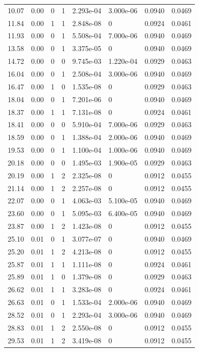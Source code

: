 \documentclass[preview]{standalone}
\begin{document}
{{\begin{tabular}{L{1.2cm}C{1.2cm} C{0.3cm}C{0.5cm} C{1.4cm}C{1.4cm} C{1.4cm}C{1.4cm}}
  10.07  &  0.00  & 0     &  1 &  2.293e-04  & 3.000e-06  & 0.0940 &  0.0469   \\ 
  11.84  &  0.00  & 1     &  1 &  2.848e-08  & 0  & 0.0924 &  0.0461   \\ 
  11.93  &  0.00  & 0     &  1 &  5.508e-04  & 7.000e-06  & 0.0940 &  0.0469   \\ 
  13.58  &  0.00  & 0     &  1 &  3.375e-05  & 0  & 0.0940 &  0.0469   \\ 
  14.72  &  0.00  & 0     &  0 &  9.745e-03  & 1.220e-04  & 0.0929 &  0.0463   \\ 
  16.04  &  0.00  & 0     &  1 &  2.508e-04  & 3.000e-06  & 0.0940 &  0.0469   \\ 
  16.47  &  0.00  & 1     &  0 &  1.535e-08  & 0  & 0.0929 &  0.0463   \\ 
  18.04  &  0.00  & 0     &  1 &  7.201e-06  & 0  & 0.0940 &  0.0469   \\ 
  18.37  &  0.00  & 1     &  1 &  7.131e-08  & 0  & 0.0924 &  0.0461   \\ 
  18.41  &  0.00  & 0     &  0 &  5.910e-04  & 7.000e-06  & 0.0929 &  0.0463   \\ 
  18.59  &  0.00  & 0     &  1 &  1.388e-04  & 2.000e-06  & 0.0940 &  0.0469   \\ 
  19.53  &  0.00  & 0     &  1 &  1.100e-04  & 1.000e-06  & 0.0940 &  0.0469   \\ 
  20.18  &  0.00  & 0     &  0 &  1.495e-03  & 1.900e-05  & 0.0929 &  0.0463   \\ 
  20.19  &  0.00  & 1     &  2 &  2.325e-08  & 0  & 0.0912 &  0.0455   \\ 
  21.14  &  0.00  & 1     &  2 &  2.257e-08  & 0  & 0.0912 &  0.0455   \\ 
  22.07  &  0.00  & 0     &  1 &  4.063e-03  & 5.100e-05  & 0.0940 &  0.0469   \\ 
  23.60  &  0.00  & 0     &  1 &  5.095e-03  & 6.400e-05  & 0.0940 &  0.0469   \\ 
  23.87  &  0.00  & 1     &  2 &  1.423e-08  & 0  & 0.0912 &  0.0455   \\ 
  25.10  &  0.01  & 0     &  1 &  3.077e-07  & 0  & 0.0940 &  0.0469   \\ 
  25.20  &  0.01  & 1     &  2 &  4.213e-08  & 0  & 0.0912 &  0.0455   \\ 
  25.87  &  0.01  & 1     &  1 &  1.111e-08  & 0  & 0.0924 &  0.0461   \\ 
  25.89  &  0.01  & 1     &  0 &  1.379e-08  & 0  & 0.0929 &  0.0463   \\ 
  26.62  &  0.01  & 1     &  1 &  3.283e-08  & 0  & 0.0924 &  0.0461   \\ 
  26.63  &  0.01  & 0     &  1 &  1.533e-04  & 2.000e-06  & 0.0940 &  0.0469   \\ 
  28.52  &  0.01  & 0     &  1 &  2.293e-04  & 3.000e-06  & 0.0940 &  0.0469   \\ 
  28.83  &  0.01  & 1     &  2 &  2.550e-08  & 0  & 0.0912 &  0.0455   \\ 
  29.53  &  0.01  & 1     &  2 &  3.419e-08  & 0  & 0.0912 &  0.0455   \\ 
\hline 
\end{tabular} 

}}
\end{document}
